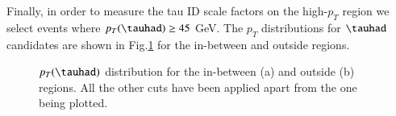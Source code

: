 Finally, in order to measure the tau ID scale factors on the high-$p_T$ region we select events where $p_T(\tauhad)\geq 45$ GeV. The $p_T$ distributions for $\tauhad$ candidates are shown in Fig.\ref{Fig6} for the in-between and outside regions.
\begin{figure}[htbp]
	\centering
	\hfill
	\caption{$p_T(\tauhad)$ distribution for the in-between (a) and outside (b) regions. All the other cuts have been applied apart from the one being plotted.}
	\label{Fig6}
\end{figure} 
